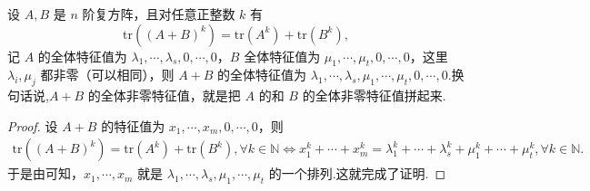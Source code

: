 \documentclass[../../main.tex]{subfiles}
\begin{document}
\begin{proposition}\label{proposition:命题24}
设 $A,B$ 是 $n$ 阶复方阵，且对任意正整数 $k$ 有 $$\mathrm{tr}((A+B)^k)=\mathrm{tr}(A^k)+\mathrm{tr}(B^k),$$记 $A$ 的全体特征值为 $\lambda_1,\cdots,\lambda_s,0,\cdots,0$，$B$ 全体特征值为 $\mu_1,\cdots,\mu_t,0,\cdots,0$，这里 $\lambda_i,\mu_j$ 都非零（可以相同），则 $A+B$ 的全体特征值为 $\lambda_1,\cdots,\lambda_s,\mu_1,\cdots,\mu_t,0,\cdots,0$.换句话说,$A+B$ 的全体非零特征值，就是把 $A$ 的和 $B$ 的全体非零特征值拼起来.
\end{proposition}
\begin{proof}
设 $A+B$ 的特征值为 $x_1,\cdots ,x_m,0,\cdots ,0$，则
\begin{align*}
\mathrm{tr}\left( \left( A+B \right) ^k \right) =\mathrm{tr}\left( A^k \right) +\mathrm{tr}\left( B^k \right) ,\forall k\in \mathbb{N} 
\Longleftrightarrow x_{1}^{k}+\cdots +x_{m}^{k}=\lambda _{1}^{k}+\cdots +\lambda _{s}^{k}+\mu _{1}^{k}+\cdots +\mu _{t}^{k},\forall k\in \mathbb{N} .
\end{align*}
于是由可知，$x_1,\cdots ,x_m$ 就是 $\lambda _1,\cdots ,\lambda _s,\mu _1,\cdots ,\mu _t$ 的一个排列.这就完成了证明.
\end{proof}
\end{document}
